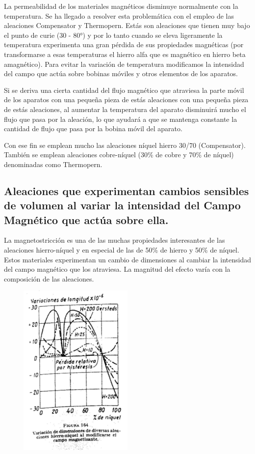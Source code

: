 \documentclass[12pt,a4paper]{article}
\begin{document}
La permeabilidad de los materiales magnéticos disminuye normalmente con la temperatura. Se ha llegado a resolver esta problemática con el empleo de las aleaciones Compensator y Thermopern. Estás son aleaciones que tienen muy bajo el punto de curie (30 - 80°) y por lo tanto cuando se eleva ligeramente la temperatura experimenta una gran pérdida de sus propiedades magnéticas (por transformarse a esas temperaturas el hierro alfa que es magnético en hierro beta amagnético). Para evitar la variación de temperatura modificamos la intensidad del campo que actúa sobre bobinas móviles y otros elementos de los aparatos.

Si se deriva una cierta cantidad del flujo magnético que atraviesa la parte móvil de los aparatos con una pequeña pieza de estás aleaciones con una pequeña pieza de estás aleaciones, al aumentar la temperatura del aparato disminuirá mucho el flujo que pasa por la aleación, lo que ayudará a que se mantenga constante la cantidad de flujo que pasa por la bobina móvil del aparato.

Con ese fin se emplean mucho las aleaciones níquel hierro 30/70 (Compensator). También se emplean aleaciones cobre-níquel (30\% de cobre y 70\% de níquel) denominadas como Thermopern.

\subsection{Aleaciones que experimentan cambios sensibles de volumen al variar la intensidad del Campo Magnético que actúa sobre ella.}

La magnetostricción es una de las muchas propiedades interesantes de las aleaciones hierro-níquel y en especial de las de 50\% de hierro y 50\% de níquel. Estos materiales experimentan un cambio de dimensiones al cambiar la intensidad del campo magnético que los atraviesa. La magnitud del efecto varía con la composición de las aleaciones.

\begin{figure}[t]    
    \centering         
    \includegraphics[width=0.5\textwidth]{IMAGENES LATEX/10.jpg}
\end{figure}
\end{document}
